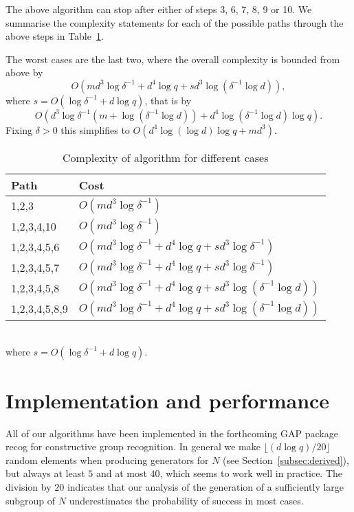 The above algorithm can stop after either of steps 3, 6, 7, 8, 9 or 10.
We summarise the complexity statements for each of the possible paths
through the above steps in Table~\ref{casescomplexity}.

The worst cases are the last two, where the overall complexity is
bounded from above by
\[ O(md^3 \log \delta^{-1} +d^4\log q
              + sd^3 \log( \delta^{-1} \log d)), \]
where $s = O(\log \delta^{-1} + d\log q)$, that is by
\[ O(d^3\log \delta^{-1}(m + \log( \delta^{-1} \log d))
              + d^4 \log( \delta^{-1} \log d) \log q). \]
Fixing $\delta > 0$ this simplifies to $O(d^4 \log (\log d) \log q + md^3)$. 
\begin{table}
\begin{center}
\begin{tabular}{|l|l|}
\hline
Path & Cost \\
\hline
\hline
1,2,3 & $O(md^3 \log \delta^{-1} )$ \\
1,2,3,4,10 & $O(md^3 \log \delta^{-1} )$ \\
1,2,3,4,5,6 & $O(md^3 \log \delta^{-1}  +d^4\log q
              + sd^3\log \delta^{-1})$ \\
1,2,3,4,5,7 & $O(md^3 \log \delta^{-1} +d^4\log q + sd^3 \log \delta^{-1})$ \\
1,2,3,4,5,8 & $O(md^3 \log \delta^{-1} +d^4\log q
              + sd^3\log(\delta^{-1} \log d))$ \\
1,2,3,4,5,8,9 & $O(md^3 \log \delta^{-1}  +d^4\log q
              + sd^3\log(\delta^{-1} \log d))$ \\
\hline
\end{tabular}
\\[3mm]
where $s = O(\log \delta^{-1} + d\log q)$.
\end{center}
\caption{Complexity of algorithm for different cases}
\label{casescomplexity}
\end{table}

\section{Implementation and performance}
\label{implcomplexity}

All of our algorithms have been implemented in the
forthcoming \textsf{GAP} package \textsf{recog} for constructive group 
recognition. In general 
we make $\lfloor (d\log q)/20 \rfloor$
random elements when producing generators for $N$ (see
Section~\ref{subsec:derived}), but always at least $5$ and 
at most $40$, which seems
to work well in practice. The division by $20$ 
indicates that our analysis of the generation of a
sufficiently large subgroup of $N$ underestimates the probability of success in
most cases.

